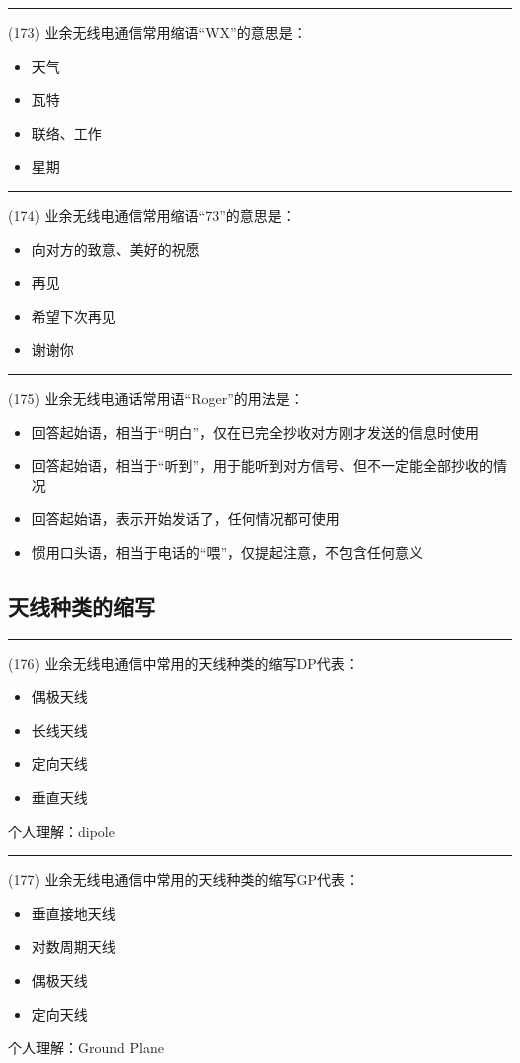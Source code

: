 \documentclass[twocolumn,hyperref,UTF8]{ctexart}  %
\begin{document}
\noindent\rule{0.5\textwidth}{1pt}
\heiti (173) 业余无线电通信常用缩语“WX”的意思是： \songti {\color{gray} [LK0396] }
\begin{itemize}
	\item  天气
	\item  瓦特
	\item  联络、工作
	\item  星期
\end{itemize}


\noindent\rule{0.5\textwidth}{1pt}
\heiti (174) 业余无线电通信常用缩语“73”的意思是： \songti {\color{gray} [LK0402] }
\begin{itemize}
	\item  向对方的致意、美好的祝愿
	\item  再见
	\item  希望下次再见
	\item  谢谢你
\end{itemize}


\noindent\rule{0.5\textwidth}{1pt}
\heiti (175) 业余无线电通话常用语“Roger”的用法是： \songti {\color{gray} [LK0404] }
\begin{itemize}
	\item  回答起始语，相当于“明白”，仅在已完全抄收对方刚才发送的信息时使用
	\item  回答起始语，相当于“听到”，用于能听到对方信号、但不一定能全部抄收的情况
	\item  回答起始语，表示开始发话了，任何情况都可使用
	\item  惯用口头语，相当于电话的“喂”，仅提起注意，不包含任何意义
\end{itemize}



\clearpage
\subsection{天线种类的缩写}


\noindent\rule{0.5\textwidth}{1pt}
\heiti (176) 业余无线电通信中常用的天线种类的缩写DP代表： \songti {\color{gray} [LK0405] }
\begin{itemize}
	\item  偶极天线
	\item  长线天线
	\item  定向天线
	\item  垂直天线
\end{itemize}
个人理解：dipole


\noindent\rule{0.5\textwidth}{1pt}
\heiti (177) 业余无线电通信中常用的天线种类的缩写GP代表： \songti {\color{gray} [LK0407] }
\begin{itemize}
	\item  垂直接地天线
	\item  对数周期天线
	\item  偶极天线
	\item  定向天线
\end{itemize}
个人理解：Ground Plane
\end{document}
